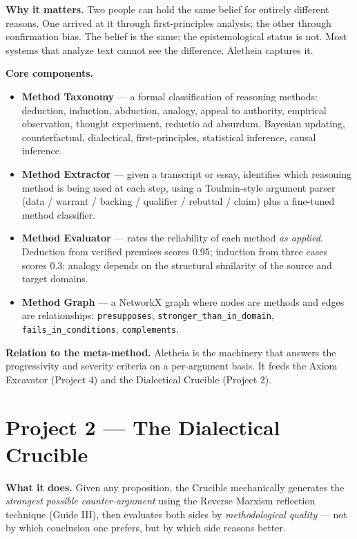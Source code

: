 \documentclass[11pt,letterpaper]{article}
\begin{document}
\textbf{Why it matters.} Two people can hold the same belief for entirely different reasons. One arrived at it through first-principles analysis; the other through confirmation bias. The belief is the same; the epistemological status is not. Most systems that analyze text cannot see the difference. Aletheia captures it.

\textbf{Core components.}

\begin{itemize}[leftmargin=1.5em,itemsep=0.1em]
\item \textbf{Method Taxonomy} --- a formal classification of reasoning methods: deduction, induction, abduction, analogy, appeal to authority, empirical observation, thought experiment, reductio ad absurdum, Bayesian updating, counterfactual, dialectical, first-principles, statistical inference, causal inference.
\item \textbf{Method Extractor} --- given a transcript or essay, identifies which reasoning method is being used at each step, using a Toulmin-style argument parser (data / warrant / backing / qualifier / rebuttal / claim) plus a fine-tuned method classifier.
\item \textbf{Method Evaluator} --- rates the reliability of each method \emph{as applied}. Deduction from verified premises scores 0.95; induction from three cases scores 0.3; analogy depends on the structural similarity of the source and target domains.
\item \textbf{Method Graph} --- a NetworkX graph where nodes are methods and edges are relationships: \texttt{presupposes}, \texttt{stronger\_than\_in\_domain}, \texttt{fails\_in\_conditions}, \texttt{complements}.
\end{itemize}

\textbf{Relation to the meta-method.} Aletheia is the machinery that answers the progressivity and severity criteria on a per-argument basis. It feeds the Axiom Excavator (Project 4) and the Dialectical Crucible (Project 2).

\section{Project 2 --- The Dialectical Crucible}

\textbf{What it does.} Given any proposition, the Crucible mechanically generates the \emph{strongest possible counter-argument} using the Reverse Marxism reflection technique (Guide III), then evaluates both sides by \emph{methodological quality} --- not by which conclusion one prefers, but by which side reasons better.
\end{document}
